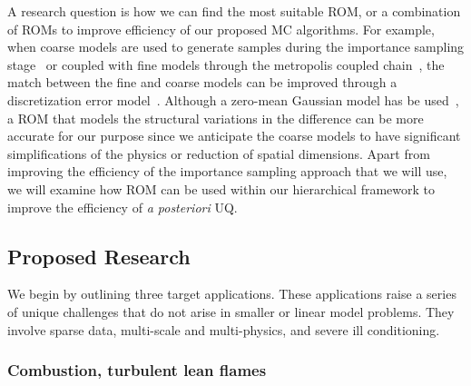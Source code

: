 \documentclass[11pt]{article}
\newcommand{\MarginPar}[1]{\marginpar{%
\vskip-\baselineskip %
\raggedright\tiny\sffamily
\hrule\smallskip{\color{red}#1}\par\smallskip\hrule}}
\begin{document}
A research question is how we can find the most suitable ROM, or a combination of ROMs to improve efficiency of our proposed MC algorithms.  
For example, when coarse models are used to generate samples
during the importance sampling stage~\cite{Bal:2013tp,Christen:2005wp,Efendiev:2007uw,Higdon:2002vx} or
coupled with fine models through the metropolis coupled chain~\cite{Higdon:2002vx}, the match between the fine and coarse models can be improved through a discretization error model~\cite{Kaipio:2007ux}. Although a zero-mean Gaussian model has be used~\cite{Bal:2013tp}, a ROM that models the structural variations in the difference can be more accurate for our purpose since we anticipate the coarse models to have significant simplifications of the physics or reduction of spatial dimensions.  Apart from improving the efficiency of the importance sampling approach that we will use,  we will examine how ROM can be used within our hierarchical framework to
improve the efficiency of {\it {a posteriori}} UQ.

\subsection*{Proposed Research}

We begin by outlining three target applications.
These applications raise a series of unique challenges that do not arise in smaller or linear
model problems.
They involve sparse data, multi-scale and multi-physics, and severe ill conditioning.

\subsubsection*{Combustion, turbulent lean flames}
\MarginPar{MSD: Rewrote this section}
\end{document}
